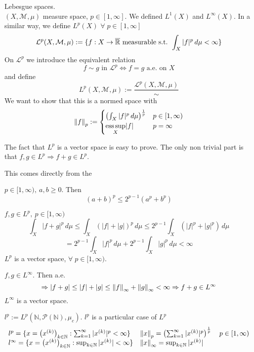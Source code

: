 Lebesgue spaces. \\
\((X, \mathcal{M}, \mu)\) measure space, \(p \in \left[1, \infty\right]\). We defined \(L^1(X)\) and \(L^\infty(X)\). 
In a similar way, we define \(L^p(X)\) \(\forall \; p \in \left[1, \infty\right]\)
\[
    \mathcal{L}^p (X, \mathcal{M}, \mu) := \{ f: X \rightarrow \overline{\mathbb{R}} \text{ measurable s.t. } \int_X |f|^p \, d\mu < \infty\}
\]
On \(\mathcal{L}^p\) we introduce the equivalent relation
\[
    f \sim g \text{ in } \mathcal{L}^p \Leftrightarrow f=g \text{ a.e. on } X 
\]
and define 
\[
    {L}^p (X, \mathcal{M}, \mu) := \frac{\mathcal{L}^p (X, \mathcal{M}, \mu)}{\sim}
\]
We want to show that this is a normed space with
\[
    \norm{f}_p := 
    \begin{cases}
        \left( \int_X |f|^p \, d\mu \right)^{\frac{1}{p}}  & p \in [1, \infty) \\
        \underset{X}{\text{ess}\, \text{sup}} |f| & p = \infty
    \end{cases}
\]

The fact that \(L^p\) is a vector space is easy to prove. The only non trivial part is that \(f, g \in L^p \Rightarrow f+g \in L^p\).

This comes directly from the 
\begin{lemma}
    \(p \in [1, \infty), \ a, b \geq 0\). Then 
    \[
        \left(a+b\right)^p \leq 2^{p-1} \left(a^p+b^p\right) 
    \]
\end{lemma}

\(f, g \in L^p, \ p \in [1, \infty)\)
\[
    \int_X |f+g|^p \, d\mu \leq \int_X (|f|+|g|)^p \, d\mu 
    \leq 2^{p-1} \int_X (|f|^p+|g|^p) \, d\mu
\]
\[
    = 2^{p-1} \int_X |f|^p \, d\mu + 2^{p-1} \int_X |g|^p \, d\mu < \infty
\]
\(L^p\) is a vector space, \(\forall \; p \in [1, \infty)\).


\(f, g \in L^\infty\). Then a.e. 
\[
    \Rightarrow |f+g| \leq |f|+|g| \leq \norm{f}_\infty + \norm{g}_\infty < \infty
    \Rightarrow f+g \in L^\infty
\]
\(L^\infty\) is a vector space. 

\begin{remark}
    \(l^p := L^p (\mathbb{N}, \mathcal{P}(\mathbb{N}), \mu_c )\). \(l^p\) is a particular case of \(L^p\)
    \[
    \begin{array}{ll}
        l^p = \{ x = \left(x^{(k)}\right)_{k \in \mathbb{N}} : \sum_{k=1}^\infty |x^{(k)}|^p < \infty \} 
        & \norm{x}_p = \left( \sum_{k=1}^\infty |x^{(k)}|^p \right)^{\frac{1}{p}} \quad p \in [1, \infty)
        \\ l^\infty = \{ x = \left(x^{(k)}\right)_{k \in \mathbb{N}} : \sup_{k \in \mathbb{N}} |x^{(k)}| < \infty \} 
        & \norm{x}_\infty = \sup_{k \in \mathbb{N}} |x^{(k)}|
    \end{array}
    \]
\end{remark}

